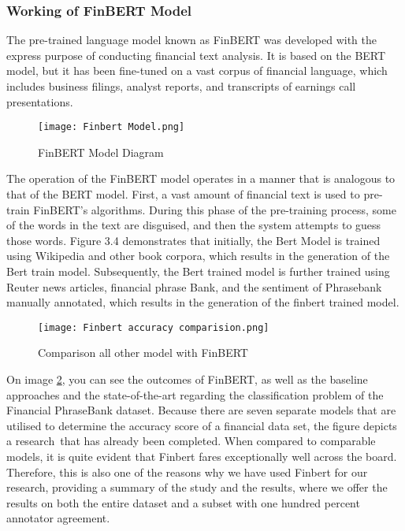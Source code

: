 \documentclass[12pt, a4paper,twoside]{report}
\theoremstyle{plain} %
\theoremstyle{definition} %
\theoremstyle{remark} %
\numberwithin{equation}{chapter}
\begin{document}
        \subsubsection{Working of FinBERT Model}

        The pre-trained language model known as FinBERT was developed with the express purpose of conducting financial text analysis. It is based on the BERT model, but it has been fine-tuned on a vast corpus of financial language, which includes business filings, analyst reports, and transcripts of earnings call presentations. 

        \begin{figure}
            \centering
            \texttt{[image: Finbert Model.png]}
            \caption{FinBERT Model Diagram}
            \label{fig:enter-label}
        \end{figure}

       The operation of the FinBERT model operates in a manner that is analogous to that of the BERT model. First, a vast amount of financial text is used to pre-train FinBERT's algorithms. During this phase of the pre-training process, some of the words in the text are disguised, and then the system attempts to guess those words.  Figure 3.4 demonstrates that initially, the Bert Model is trained using Wikipedia and other book corpora, which results in the generation of the Bert train model. Subsequently, the Bert trained model is further trained using Reuter news articles, financial phrase Bank, and the sentiment of Phrasebank manually annotated, which results in the generation of the finbert trained model.

        \begin{figure}
            \centering
            \texttt{[image: Finbert accuracy comparision.png]}
            \caption{Comparison all other model with FinBERT \cite{araci2019finbert}}
            \label{fig:finberttable}
        \end{figure}

        On image \ref{fig:finberttable}, you can see the outcomes of FinBERT, as well as the baseline approaches and the state-of-the-art regarding the classification problem of the Financial PhraseBank dataset. Because there are seven separate models that are utilised to determine the accuracy score of a financial data set, the figure depicts a research that has already been completed. When compared to comparable models, it is quite evident that Finbert fares exceptionally well across the board. Therefore, this is also one of the reasons why we have used Finbert for our research, providing a summary of the study and the results, where we offer the results on both the entire dataset and a subset with one hundred percent annotator agreement.
        
\end{document}
